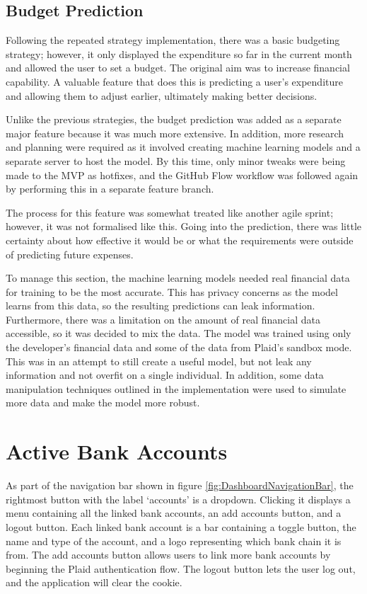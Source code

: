 \subsection{Budget Prediction}
Following the repeated strategy implementation, there was a basic budgeting strategy; however, it only displayed the expenditure so far in the current month and allowed the user to set a budget. The original aim was to increase financial capability. A valuable feature that does this is predicting a user's expenditure and allowing them to adjust earlier, ultimately making better decisions.

Unlike the previous strategies, the budget prediction was added as a separate major feature because it was much more extensive. In addition, more research and planning were required as it involved creating machine learning models and a separate server to host the model. By this time, only minor tweaks were being made to the MVP as hotfixes, and the GitHub Flow workflow was followed again by performing this in a separate feature branch.

The process for this feature was somewhat treated like another agile sprint; however, it was not formalised like this. Going into the prediction, there was little certainty about how effective it would be or what the requirements were outside of predicting future expenses.

To manage this section, the machine learning models needed real financial data for training to be the most accurate. This has privacy concerns as the model learns from this data, so the resulting predictions can leak information. Furthermore, there was a limitation on the amount of real financial data accessible, so it was decided to mix the data. The model was trained using only the developer's financial data and some of the data from Plaid's sandbox mode. This was in an attempt to still create a useful model, but not leak any information and not overfit on a single individual. In addition, some data manipulation techniques outlined in the implementation were used to simulate more data and make the model more robust.

\section{Active Bank Accounts}
As part of the navigation bar shown in figure \ref{fig:DashboardNavigationBar}, the rightmost button with the label `accounts' is a dropdown. Clicking it displays a menu containing all the linked bank accounts, an add accounts button, and a logout button. Each linked bank account is a bar containing a toggle button, the name and type of the account, and a logo representing which bank chain it is from. The add accounts button allows users to link more bank accounts by beginning the Plaid authentication flow. The logout button lets the user log out, and the application will clear the cookie.

